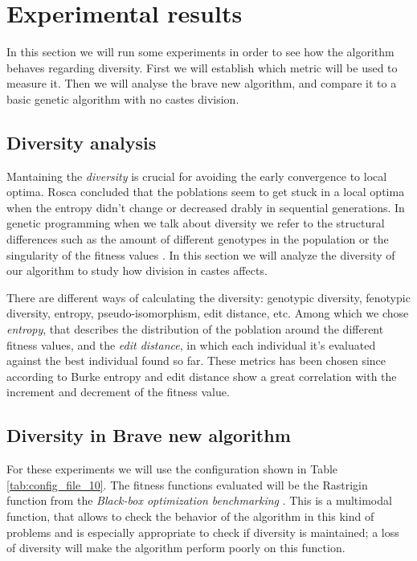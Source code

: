 \section{Experimental results}
\label{sec:experiments}

In this section we will run some experiments in order to see how the algorithm
behaves regarding diversity.  First we will establish which metric will be
used to measure it. Then we will analyse the brave new algorithm, and compare
it to a basic genetic algorithm with no castes division.

\subsection{Diversity analysis}

Mantaining the \emph{diversity} is crucial for avoiding the early convergence to local optima. Rosca \cite{Rosca} concluded that 
the poblations seem to get stuck in a local optima when the entropy didn't change or decreased drably in sequential generations.
In genetic programming when we talk about diversity we refer to the structural differences such as the amount of different
genotypes in the population or the singularity of the fitness values \cite{genetic}. In this section we will analyze the diversity of our
algorithm to study how division in castes affects.

There are different ways of calculating the diversity: genotypic diversity, fenotypic diversity, entropy, pseudo-isomorphism, edit distance, etc.
Among which we chose \textit{entropy}, that describes the distribution of the poblation around the different fitness values, and the \textit{edit distance},
in which each individual it's evaluated against the best individual found so far. These metrics has been chosen since according to Burke \cite{diversity} entropy
and edit distance show a great correlation with the increment and decrement of the fitness value.

\subsection{Diversity in Brave new algorithm}

For these experiments we will use the configuration shown in Table
\ref{tab:config_file_10}. The fitness functions evaluated will be the Rastrigin
function from the \emph{Black-box optimization benchmarking} \cite{BBOB}. This
is a multimodal function, that allows to check the behavior of the algorithm in
this kind of problems and is especially appropriate to check if diversity is
maintained; a loss of diversity will make the algorithm perform poorly on this
function.

